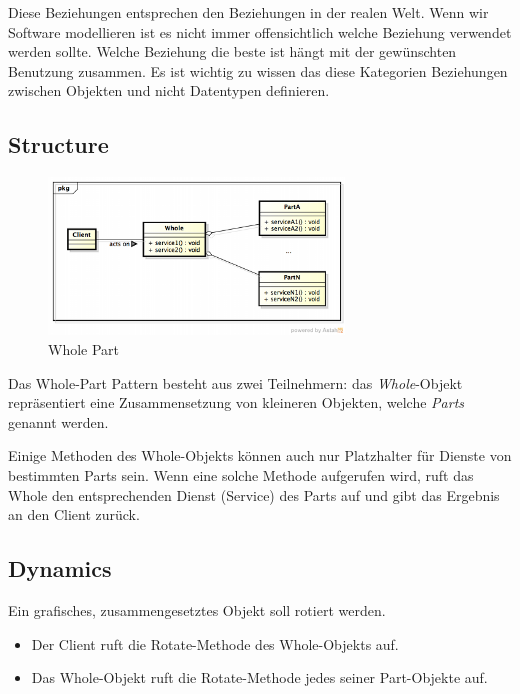 Diese Beziehungen entsprechen den Beziehungen in der realen Welt. Wenn wir Software modellieren ist es nicht immer offensichtlich welche Beziehung verwendet werden sollte. Welche Beziehung die beste ist hängt mit der gewünschten Benutzung zusammen.
Es ist wichtig zu wissen das diese Kategorien Beziehungen zwischen Objekten und nicht Datentypen definieren.

\subsection*{Structure}


\begin{figure}[H]
	\centering
	\includegraphics[width=0.7\textwidth]{content/posa1/images/whole-part-classes.png}
	\caption{Whole Part}
\end{figure}


Das Whole-Part Pattern besteht aus zwei Teilnehmern: das \textit{Whole}-Objekt repräsentiert eine Zusammensetzung von kleineren Objekten, welche \textit{Parts} genannt werden.

Einige Methoden des Whole-Objekts können auch nur Platzhalter für Dienste von bestimmten Parts sein. Wenn eine solche Methode aufgerufen wird, ruft das Whole den entsprechenden Dienst (Service) des Parts auf und gibt das Ergebnis an den Client zurück.

\subsection*{Dynamics}


Ein grafisches, zusammengesetztes Objekt soll rotiert werden.

\begin{itemize}
	\item Der Client ruft die Rotate-Methode des Whole-Objekts auf.
	\item Das Whole-Objekt ruft die Rotate-Methode jedes seiner Part-Objekte auf.
\end{itemize}

